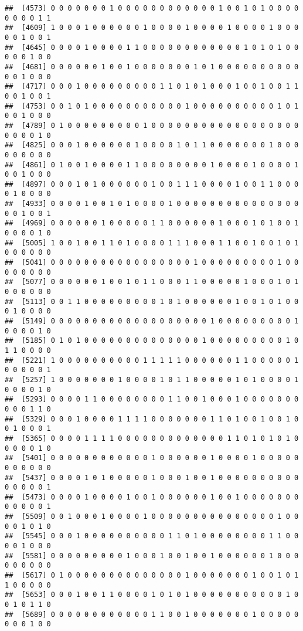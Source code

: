 \documentclass[
]{article}
\begin{document}
\begin{verbatim}
##  [4573] 0 0 0 0 0 0 0 1 0 0 0 0 0 0 0 0 0 0 0 0 1 0 0 1 0 1 0 0 0 0 0 0 0 0 1 1
##  [4609] 1 0 0 0 1 0 0 0 0 0 0 1 0 0 0 0 1 0 0 0 0 1 0 0 0 0 1 0 0 0 0 0 1 0 0 1
##  [4645] 0 0 0 0 1 0 0 0 0 1 1 0 0 0 0 0 0 0 0 0 0 0 0 1 0 1 0 1 0 0 0 0 0 1 0 0
##  [4681] 0 0 0 0 0 0 1 0 0 1 0 0 0 0 0 0 0 1 0 1 0 0 0 0 0 0 0 0 0 0 0 0 1 0 0 0
##  [4717] 0 0 0 1 0 0 0 0 0 0 0 0 0 1 1 0 1 0 1 0 0 0 1 0 0 1 0 0 1 1 0 0 1 0 0 1
##  [4753] 0 0 1 0 1 0 0 0 0 0 0 0 0 0 0 0 1 0 0 0 0 0 0 0 0 0 0 1 0 1 0 0 1 0 0 0
##  [4789] 0 1 0 0 0 0 0 0 0 0 0 1 0 0 0 0 0 0 0 0 0 0 0 0 0 0 0 0 0 0 0 0 0 0 1 0
##  [4825] 0 0 0 1 0 0 0 0 0 0 1 0 0 0 0 1 0 1 1 0 0 0 0 0 0 0 1 0 0 0 0 0 0 0 0 0
##  [4861] 0 1 0 0 1 0 0 0 0 1 1 0 0 0 0 0 0 0 0 1 0 0 0 0 1 0 0 0 0 1 0 0 1 0 0 0
##  [4897] 0 0 0 1 0 1 0 0 0 0 0 0 1 0 0 1 1 1 0 0 0 0 1 0 0 1 1 0 0 0 0 1 0 0 0 0
##  [4933] 0 0 0 0 1 0 0 1 0 1 0 0 0 0 1 0 0 0 0 0 0 0 0 0 0 0 0 0 0 0 0 0 1 0 0 1
##  [4969] 0 0 0 0 0 0 1 0 0 0 0 0 1 1 0 0 0 0 0 0 1 0 0 0 1 0 1 0 0 1 0 0 0 0 1 0
##  [5005] 1 0 0 1 0 0 1 1 0 1 0 0 0 0 1 1 1 0 0 0 1 1 0 0 1 0 0 1 0 1 0 0 0 0 0 0
##  [5041] 0 0 0 0 0 0 0 0 0 0 0 0 0 0 0 0 0 1 0 0 0 0 0 0 0 0 0 1 0 0 0 0 0 0 0 0
##  [5077] 0 0 0 0 0 0 1 0 0 1 0 1 1 0 0 0 1 1 0 0 0 0 0 1 0 0 0 1 0 1 0 0 0 0 0 0
##  [5113] 0 0 1 1 0 0 0 0 0 0 0 0 0 1 0 1 0 0 0 0 0 0 1 0 0 1 0 1 0 0 0 1 0 0 0 0
##  [5149] 0 0 0 0 0 0 0 0 0 0 0 0 0 0 0 0 0 0 0 1 0 0 0 0 0 0 0 0 0 1 0 0 0 0 1 0
##  [5185] 0 1 0 1 0 0 0 0 0 0 0 0 0 0 0 0 0 0 1 0 0 0 0 0 0 0 0 0 1 0 1 1 0 0 0 0
##  [5221] 1 0 0 0 0 0 0 0 0 0 0 1 1 1 1 1 0 0 0 0 0 0 1 1 0 0 0 0 0 1 0 0 0 0 0 1
##  [5257] 1 0 0 0 0 0 0 0 1 0 0 0 0 1 0 1 1 0 0 0 0 0 1 0 1 0 0 0 0 1 0 0 0 0 1 0
##  [5293] 0 0 0 0 1 1 0 0 0 0 0 0 0 0 1 1 0 0 1 0 0 0 1 0 0 0 0 0 0 0 0 0 0 1 1 0
##  [5329] 0 0 0 1 0 0 0 0 1 1 1 1 0 0 0 0 0 0 0 1 1 0 1 0 0 1 0 0 1 0 0 1 0 0 0 1
##  [5365] 0 0 0 0 1 1 1 1 0 0 0 0 0 0 0 0 0 0 0 0 0 1 1 0 1 0 1 0 1 0 0 0 0 0 1 0
##  [5401] 0 0 0 0 0 0 0 0 0 0 0 0 1 0 0 0 0 0 0 1 0 0 0 0 1 0 0 0 0 0 0 0 0 0 0 0
##  [5437] 0 0 0 0 1 0 1 0 0 0 0 0 1 0 0 0 1 0 0 1 0 0 0 0 0 0 0 0 0 0 0 0 0 0 0 1
##  [5473] 0 0 0 0 1 0 0 0 0 1 0 0 1 0 0 0 0 0 0 1 0 0 1 0 0 0 0 0 0 0 0 0 0 0 0 1
##  [5509] 0 0 1 0 0 0 1 0 0 0 0 1 0 0 0 0 0 0 0 0 0 0 0 0 0 0 0 1 0 0 0 0 1 0 1 0
##  [5545] 0 0 0 1 0 0 0 0 0 0 0 0 0 0 1 1 0 1 0 0 0 0 0 0 0 0 1 1 0 0 0 0 1 0 0 0
##  [5581] 0 0 0 0 0 0 0 0 0 1 0 0 0 1 0 0 1 0 0 1 0 0 0 0 0 0 1 0 0 0 0 0 0 0 0 0
##  [5617] 0 1 0 0 0 0 0 0 0 0 0 0 0 0 0 0 1 0 0 0 0 0 0 0 1 0 0 1 0 1 1 0 0 0 0 0
##  [5653] 0 0 0 1 0 0 1 1 0 0 0 0 1 0 1 0 1 0 0 0 0 0 0 0 0 0 0 0 1 0 0 1 0 1 1 0
##  [5689] 0 0 0 0 0 0 0 0 0 0 0 0 1 1 0 0 1 0 0 0 0 0 0 0 1 0 0 0 0 0 0 0 0 1 0 0

\end{verbatim}
\end{document}
